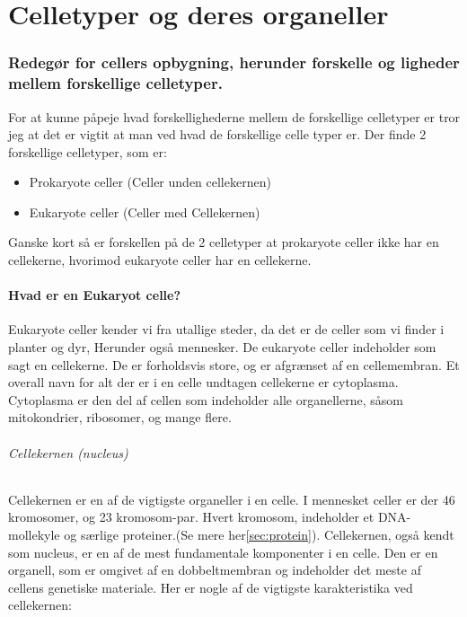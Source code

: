\newpage
\part{Celletyper og deres organeller}\label{sec:celletyperogderesorganeller}
    \section*{Redegør for cellers opbygning, herunder forskelle og ligheder mellem forskellige celletyper.}
        For at kunne påpeje hvad forskellighederne mellem de forskellige celletyper er tror jeg at det er vigtit at man ved hvad de forskellige celle typer er. 
        Der finde 2 forskellige celletyper, som er:
        \begin{itemize}
            \item Prokaryote celler (Celler unden cellekernen)
            \item Eukaryote celler (Celler med Cellekernen)
        \end{itemize}
        Ganske kort så er forskellen på de 2 celletyper at prokaryote celler ikke har en cellekerne, hvorimod eukaryote celler har en cellekerne.
        \subsection*{Hvad er en Eukaryot celle?}
            Eukaryote celler kender vi fra utallige steder, da det er de celler som vi finder i planter og dyr, Herunder også mennesker.
            De eukaryote celler indeholder som sagt en cellekerne. De er forholdsvis store, og er afgrænset af en cellemembran. 
            Et overall navn for alt der er i en celle undtagen cellekerne er cytoplasma. Cytoplasma er den del af cellen som indeholder alle organellerne, såsom mitokondrier, ribosomer, og mange flere.
            \paragraph{Cellekernen (nucleus)}
                Cellekernen er en af de vigtigste organeller i en celle. I mennesket celler er der 46 kromosomer, og 23 kromosom-par. Hvert kromosom, indeholder et DNA-mollekyle og særlige proteiner.(Se mere her\ref{sec:protein}).
                Cellekernen, også kendt som nucleus, er en af de mest fundamentale komponenter i en celle. Den er en organell, som er omgivet af en dobbeltmembran og indeholder det meste af cellens genetiske materiale. Her er nogle af de vigtigste karakteristika ved cellekernen:

